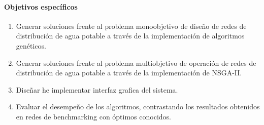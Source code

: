 \documentclass[11pt,letterpaper]{article}
\begin{document}
\paragraph{Objetivos específicos}%
\begin{enumerate}
\item Generar soluciones frente al problema monoobjetivo de diseño de redes de distribución de agua potable a través de la implementación de algoritmos genéticos.
\item Generar soluciones frente al problema multiobjetivo de operación de redes de distribución de agua potable a través de la implementación de NSGA-II.
\item Diseñar he implementar interfaz grafica del sistema. 
\item Evaluar el desempeño de los algoritmos, contrastando los resultados obtenidos en redes de benchmarking con óptimos conocidos.

\end{enumerate}
\end{document}
